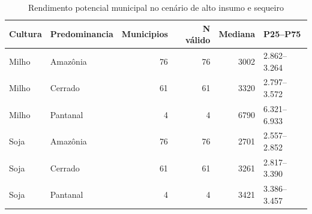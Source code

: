\begin{table}

\caption{\label{tab:h1-capacidade}Rendimento potencial municipal no cenário de alto insumo e sequeiro}
\centering
\begin{tabular}[t]{l|l|r|r|r|l}
\hline
Cultura & Predominancia & Municipios & N válido & Mediana & P25--P75\\
\hline
Milho & Amazônia & 76 & 76 & 3002 & 2.862--3.264\\
\hline
Milho & Cerrado & 61 & 61 & 3320 & 2.797--3.572\\
\hline
Milho & Pantanal & 4 & 4 & 6790 & 6.321--6.933\\
\hline
Soja & Amazônia & 76 & 76 & 2701 & 2.557--2.852\\
\hline
Soja & Cerrado & 61 & 61 & 3261 & 2.817--3.390\\
\hline
Soja & Pantanal & 4 & 4 & 3421 & 3.386--3.457\\
\hline
\end{tabular}
\end{table}
\par{}

